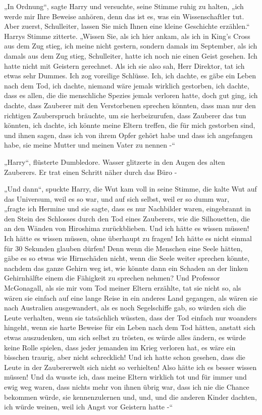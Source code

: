 {„In Ordnung“, sagte Harry und versuchte, seine Stimme ruhig zu halten, „ich werde mir Ihre Beweise anhören, denn das ist es, was ein Wissenschaftler tut. Aber zuerst, Schulleiter, lassen Sie mich Ihnen eine kleine Geschichte erzählen.“ Harrys Stimme zitterte. „Wissen Sie, als ich hier ankam, als ich in King's Cross aus dem Zug stieg, ich meine nicht gestern, sondern damals im September, als ich damals aus dem Zug stieg, Schulleiter, hatte ich noch nie einen Geist gesehen. Ich hatte nicht mit Geistern gerechnet. Als ich sie also sah, Herr Direktor, tat ich etwas sehr Dummes. Ich zog voreilige Schlüsse. Ich, ich dachte, es gäbe ein Leben nach dem Tod, ich dachte, niemand wäre jemals wirklich gestorben, ich dachte, dass es allen, die die menschliche Spezies jemals verloren hatte, doch gut ging, ich dachte, dass Zauberer mit den Verstorbenen sprechen könnten, dass man nur den richtigen Zauberspruch bräuchte, um sie herbeizurufen, dass Zauberer das tun könnten, ich dachte, ich könnte meine Eltern treffen, die für mich gestorben sind, und ihnen sagen, dass ich von ihrem Opfer gehört habe und dass ich angefangen habe, sie meine Mutter und meinen Vater zu nennen -“

„Harry“, flüsterte Dumbledore. Wasser glitzerte in den Augen des alten Zauberers. Er trat einen Schritt näher durch das Büro -

„Und dann“, spuckte Harry, die Wut kam voll in seine Stimme, die kalte Wut auf das Universum, weil es so war, und auf sich selbst, weil er so dumm war,\\ „fragte ich Hermine und sie sagte, dass es nur Nachbilder waren, eingebrannt in den Stein des Schlosses durch den Tod eines Zauberers, wie die Silhouetten, die an den Wänden von Hiroshima zurückblieben. Und ich hätte es wissen müssen! Ich hätte es wissen müssen, ohne überhaupt zu fragen! Ich hätte es nicht einmal für 30 Sekunden glauben dürfen! Denn wenn die Menschen eine Seele hätten, gäbe es so etwas wie Hirnschäden nicht, wenn die Seele weiter sprechen könnte, nachdem das ganze Gehirn weg ist, wie könnte dann ein Schaden an der linken Gehirnhälfte einem die Fähigkeit zu sprechen nehmen? Und Professor McGonagall, als sie mir vom Tod meiner Eltern erzählte, tat sie nicht so, als wären sie einfach auf eine lange Reise in ein anderes Land gegangen, als wären sie nach Australien ausgewandert, als es noch Segelschiffe gab, so würden sich die Leute verhalten, wenn sie tatsächlich wüssten, dass der Tod einfach nur woanders hingeht, wenn sie harte Beweise für ein Leben nach dem Tod hätten, anstatt sich etwas auszudenken, um sich selbst zu trösten, es würde alles ändern, es würde keine Rolle spielen, dass jeder jemanden im Krieg verloren hat, es wäre ein bisschen traurig, aber nicht schrecklich! Und ich hatte schon gesehen, dass die Leute in der Zaubererwelt sich nicht so verhielten! Also hätte ich es besser wissen müssen! Und da wusste ich, dass meine Eltern wirklich tot und für immer und ewig weg waren, dass nichts mehr von ihnen übrig war, dass ich nie die Chance bekommen würde, sie kennenzulernen und, und, und die anderen Kinder dachten, ich würde weinen, weil ich Angst vor Geistern hatte -“

}
